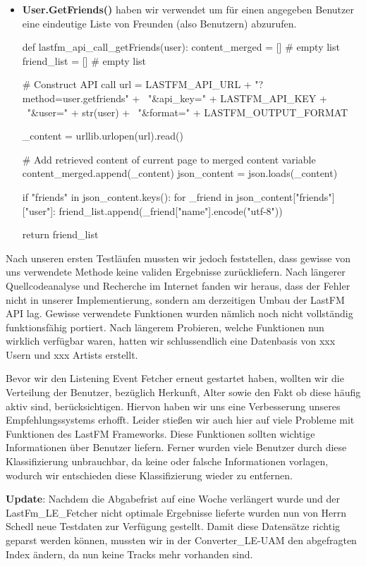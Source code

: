 \documentclass[prodmode,acmtecs]{acmsmall} %
\begin{document}
\begin{itemize}
\item \textbf{User.GetFriends()} haben wir verwendet um für einen angegeben Benutzer eine eindeutige Liste von Freunden (also Benutzern) abzurufen.
\begin{python}
def lastfm_api_call_getFriends(user):
    content_merged = []         # empty list
    friend_list = []            # empty list

    # Construct API call
    url = LASTFM_API_URL + "?method=user.getfriends" + \
        "&api_key=" + LASTFM_API_KEY + \
        "&user=" + str(user) + \
        "&format=" + LASTFM_OUTPUT_FORMAT

    _content = urllib.urlopen(url).read()

    # Add retrieved content of current page to merged content variable
    content_merged.append(_content)
    json_content = json.loads(_content)

    if "friends" in json_content.keys():
        for _friend in json_content["friends"]["user"]:
            friend_list.append(_friend["name"].encode("utf-8"))

    return friend_list
\end{python}
\end{itemize}

Nach unseren ersten Testläufen mussten wir jedoch feststellen, dass gewisse von uns verwendete Methode keine validen Ergebnisse zurückliefern. Nach längerer Quellcodeanalyse und Recherche im Internet fanden wir heraus, dass der Fehler nicht in unserer Implementierung, sondern am derzeitigen Umbau der LastFM API lag. Gewisse verwendete Funktionen wurden nämlich noch nicht vollständig funktionsfähig portiert. Nach längerem Probieren, welche Funktionen nun wirklich verfügbar waren, hatten wir schlussendlich eine Datenbasis von xxx Usern und xxx Artists erstellt.

Bevor wir den Listening Event Fetcher erneut gestartet haben, wollten wir die Verteilung der Benutzer, bezüglich Herkunft, Alter sowie den Fakt ob diese häufig aktiv sind, berücksichtigen. Hiervon haben wir uns eine Verbesserung unseres Empfehlungssystems erhofft. Leider stießen wir auch hier auf viele Probleme mit Funktionen des LastFM Frameworks. Diese Funktionen sollten wichtige Informationen über Benutzer liefern. Ferner wurden viele Benutzer durch diese Klassifizierung unbrauchbar, da keine oder falsche Informationen vorlagen, wodurch wir entschieden diese Klassifizierung wieder zu entfernen.


\textbf{Update}:
Nachdem die Abgabefrist auf eine Woche verlängert wurde und der LastFm\_LE\_Fetcher nicht optimale Ergebnisse lieferte wurden nun von Herrn Schedl neue Testdaten zur Verfügung gestellt. Damit diese Datensätze richtig geparst werden können, mussten wir in der Converter\_LE-UAM den abgefragten Index ändern, da nun keine Tracks mehr vorhanden sind.
\end{document}

